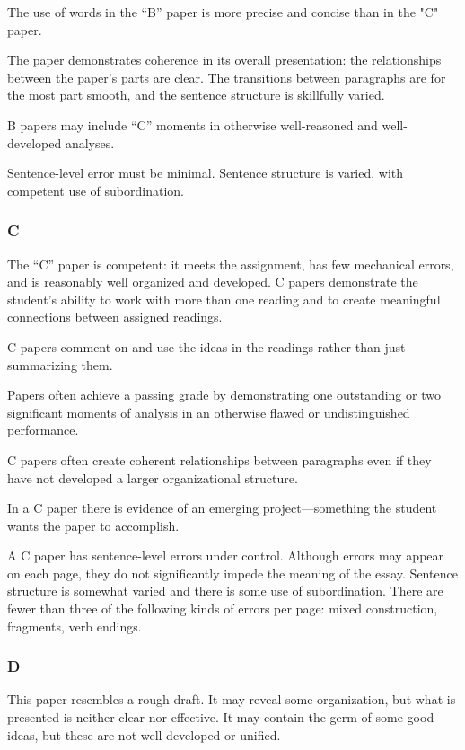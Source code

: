 \documentclass{article}
\begin{document}
The use of words in the ``B'' paper is more precise and concise than in the "C" paper.

The paper demonstrates coherence in its overall presentation: the relationships between the paper's parts are clear. The transitions between paragraphs are for the most part smooth, and the sentence structure is skillfully varied.

B papers may include ``C'' moments in otherwise well-reasoned and well-developed analyses.

Sentence-level error must be minimal.  Sentence structure is varied, with competent use of subordination.

\subsubsection{C}
The ``C'' paper is competent: it meets the assignment, has few mechanical errors, and is reasonably well organized and developed.  C papers demonstrate the student's ability to work with more than one reading and to create meaningful connections between assigned readings. 

C papers comment on and use the ideas in the readings rather than just summarizing them. 

Papers often achieve a passing grade by demonstrating one outstanding or two significant moments of analysis in an otherwise flawed or undistinguished performance.

C papers often create coherent relationships between paragraphs even if they have not developed a larger organizational structure.

In a C paper there is evidence of an emerging project—something the student wants the paper to accomplish.

A C paper has sentence-level errors under control. Although errors may appear on each page, they do not significantly impede the meaning of the essay. Sentence structure is somewhat varied and there is some use of subordination.  There are fewer than three of the following kinds of errors per page: mixed construction, fragments, verb endings.

\subsubsection{D}
This paper resembles a rough draft. It may reveal some organization, but what is presented is neither clear nor effective. It may contain the germ of some good ideas, but these are not well developed or unified. 
\end{document}
